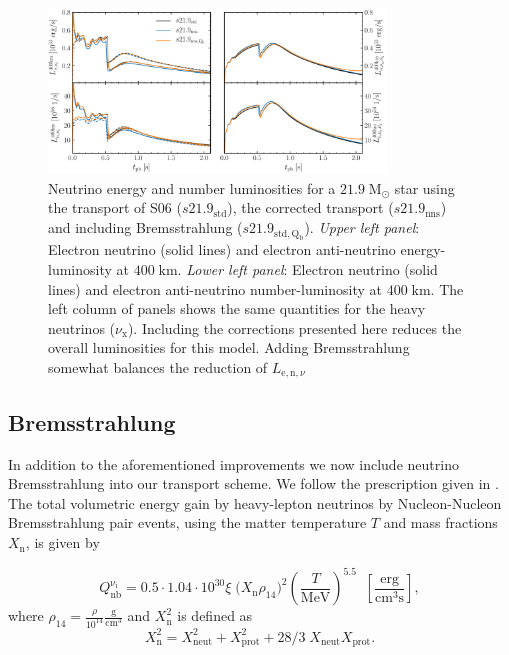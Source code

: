\documentclass[fleqn,usenatbib]{mnras}
\begin{document}
\begin{appendices}
 \begin{figure}
 \centering
 \includegraphics[width=0.8\textwidth]{./pic/s21_9_trans_tests.pdf}
 \caption{Neutrino energy and number luminosities for a $21.9\;\mathrm{M_{\odot}}$ star using the transport of S06 ($s21.9_{\mathrm{std}}$), the corrected transport ($s21.9_{\mathrm{nns}}$) and including Bremsstrahlung ($s21.9_{\mathrm{std,Q_b}}$). \textit{Upper left panel}: Electron neutrino (solid lines) and electron anti-neutrino energy-luminosity at $400\;\mathrm{km}$. \textit{Lower left panel}: Electron neutrino (solid lines) and electron anti-neutrino number-luminosity at $400\;\mathrm{km}$. The left column of panels shows the same quantities for the heavy neutrinos ($\nu_{\mathrm{x}}$). Including the corrections presented here reduces the overall luminosities for this model. Adding Bremsstrahlung somewhat balances the reduction of $L_{\mathrm{e,n},\nu}$}
 \label{fig:s21.9_tras}
\end{figure}

 \subsection{Bremsstrahlung}

 In addition to the aforementioned improvements we now include neutrino Bremsstrahlung into our transport scheme. We follow the prescription given in \cite{BurrowsEtAl2006}.
 The total volumetric energy gain by heavy-lepton neutrinos by Nucleon-Nucleon Bremsstrahlung pair events, using the matter temperature $T$ and mass fractions $X_{\mathrm{n}}$, is given by

\begin{equation}
    Q_{\mathrm{nb}}^{\mathrm{\nu_i}} = 0.5\cdot 1.04\cdot 10^{30} \xi \; \big(X_{\mathrm{n}}\rho_{14}\big)^2 (\frac{T}{\mathrm{MeV}})^{5.5} \;\; [\frac{\mathrm{erg}}{\mathrm{cm^3s}}],
\end{equation}
where $\rho_{14} = \frac{\rho}{10^{14}} \mathrm{\frac{g}{cm^3}} $
and $X_{\mathrm{n}}^2$ is defined as
\begin{equation*}
 X_{\mathrm{n}}^2 = X_{\mathrm{neut}}^2 + X_{\mathrm{prot}}^2 + 28/3\; X_{\mathrm{neut}}X_{\mathrm{prot}}.
\end{equation*}


\end{appendices}
\end{document}
